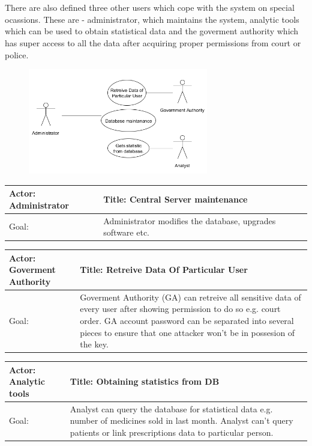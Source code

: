 \normalsize
\section{}

There are also defined three other users which cope with the system on special ocassions.
These are - administrator, which maintains the system, analytic tools which can be used to obtain statistical data and the goverment authority which has super access to all the data after acquiring proper permissions from court or police.

\begin{figure}[h]
\begin{center}
\includegraphics[width=0.7\textwidth]{database/specialUseCases.png}
\end{center}
\end{figure} 

\small
    \begin{longtable}{| p{6cm} | p{7.75cm} |}
    \hline
    Actor: Administrator &Title: Central Server maintenance \\ \hline
    Goal: & Administrator modifies the database, upgrades software etc. \\ \hline
    \end{longtable}


\newpage
    \begin{longtable}{| p{6cm} | p{7.75cm} |}
    \hline
    Actor: Goverment Authority &Title: Retreive Data Of Particular User \\ \hline
    Goal: & Goverment Authority (GA) can retreive all sensitive data of every user after showing permission to do so e.g. court order. GA account password can be separated into several pieces to ensure that one attacker won't be in possesion of the key. \\ \hline
    \end{longtable}



    \begin{longtable}{| p{6cm} | p{7.75cm} |}
    \hline
    Actor: Analytic tools &Title: Obtaining statistics from DB \\ \hline
    Goal: & Analyst can query the database for statistical data e.g. number of medicines sold in last month. Analyst can't query patients or link prescriptions data to particular person. \\ \hline
    \end{longtable}

\normalsize
